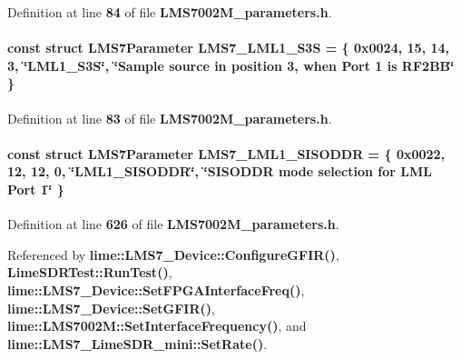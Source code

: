Definition at line {\bf 84} of file {\bf L\+M\+S7002\+M\+\_\+parameters.\+h}.

\paragraph[{L\+M\+S7\+\_\+\+L\+M\+L1\+\_\+\+S3S}]{\setlength{\rightskip}{0pt plus 5cm}const struct {\bf L\+M\+S7\+Parameter} L\+M\+S7\+\_\+\+L\+M\+L1\+\_\+\+S3S = \{ 0x0024, 15, 14, 3, \char`\"{}\+L\+M\+L1\+\_\+\+S3\+S\char`\"{}, \char`\"{}\+Sample source in position 3, when Port 1 is R\+F2\+B\+B\char`\"{} \}\hspace{0.3cm}{\ttfamily [static]}}\label{LMS7002M__parameters_8h_aedd0506481511454e96f24781235cbf9}


Definition at line {\bf 83} of file {\bf L\+M\+S7002\+M\+\_\+parameters.\+h}.

\paragraph[{L\+M\+S7\+\_\+\+L\+M\+L1\+\_\+\+S\+I\+S\+O\+D\+DR}]{\setlength{\rightskip}{0pt plus 5cm}const struct {\bf L\+M\+S7\+Parameter} L\+M\+S7\+\_\+\+L\+M\+L1\+\_\+\+S\+I\+S\+O\+D\+DR = \{ 0x0022, 12, 12, 0, \char`\"{}\+L\+M\+L1\+\_\+\+S\+I\+S\+O\+D\+D\+R\char`\"{}, \char`\"{}\+S\+I\+S\+O\+D\+D\+R mode selection for L\+M\+L Port 1\char`\"{} \}\hspace{0.3cm}{\ttfamily [static]}}\label{LMS7002M__parameters_8h_a506b52d82c1d155397c546613262143e}


Definition at line {\bf 626} of file {\bf L\+M\+S7002\+M\+\_\+parameters.\+h}.



Referenced by {\bf lime\+::\+L\+M\+S7\+\_\+\+Device\+::\+Configure\+G\+F\+I\+R()}, {\bf Lime\+S\+D\+R\+Test\+::\+Run\+Test()}, {\bf lime\+::\+L\+M\+S7\+\_\+\+Device\+::\+Set\+F\+P\+G\+A\+Interface\+Freq()}, {\bf lime\+::\+L\+M\+S7\+\_\+\+Device\+::\+Set\+G\+F\+I\+R()}, {\bf lime\+::\+L\+M\+S7002\+M\+::\+Set\+Interface\+Frequency()}, and {\bf lime\+::\+L\+M\+S7\+\_\+\+Lime\+S\+D\+R\+\_\+mini\+::\+Set\+Rate()}.


